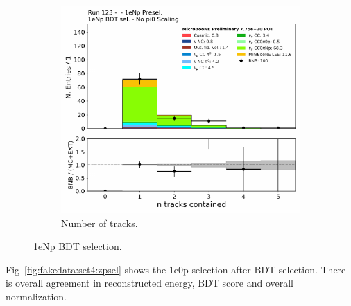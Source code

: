 \begin{figure}[H]
\begin{center}
\begin{subfigure}[b]{0.45\textwidth}
    \includegraphics[width=1.00\textwidth]{Fakedata/set4/Np_postsel_ntracks.pdf}
    \caption{\label{fig:fakedata:set4:Np_postsel_ntracks} Number of tracks.}
    \end{subfigure}
\caption{\label{fig:fakedata:set4:npsel} 1eNp BDT selection.}
\end{center}
\end{figure}

Fig~\ref{fig:fakedata:set4:zpsel} shows the 1e0p selection after BDT selection.  There is overall agreement in reconstructed energy, BDT score and overall normalization.

